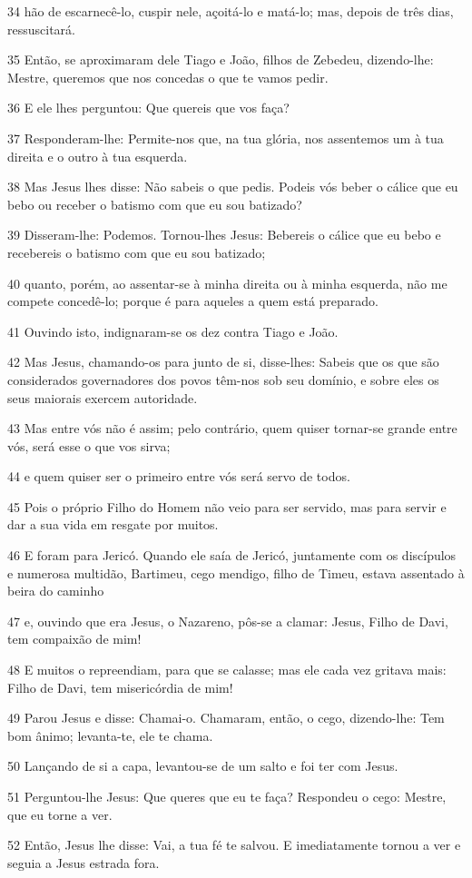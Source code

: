 \par 34 hão de escarnecê-lo, cuspir nele, açoitá-lo e matá-lo; mas, depois de três dias, ressuscitará.
\par 35 Então, se aproximaram dele Tiago e João, filhos de Zebedeu, dizendo-lhe: Mestre, queremos que nos concedas o que te vamos pedir.
\par 36 E ele lhes perguntou: Que quereis que vos faça?
\par 37 Responderam-lhe: Permite-nos que, na tua glória, nos assentemos um à tua direita e o outro à tua esquerda.
\par 38 Mas Jesus lhes disse: Não sabeis o que pedis. Podeis vós beber o cálice que eu bebo ou receber o batismo com que eu sou batizado?
\par 39 Disseram-lhe: Podemos. Tornou-lhes Jesus: Bebereis o cálice que eu bebo e recebereis o batismo com que eu sou batizado;
\par 40 quanto, porém, ao assentar-se à minha direita ou à minha esquerda, não me compete concedê-lo; porque é para aqueles a quem está preparado.
\par 41 Ouvindo isto, indignaram-se os dez contra Tiago e João.
\par 42 Mas Jesus, chamando-os para junto de si, disse-lhes: Sabeis que os que são considerados governadores dos povos têm-nos sob seu domínio, e sobre eles os seus maiorais exercem autoridade.
\par 43 Mas entre vós não é assim; pelo contrário, quem quiser tornar-se grande entre vós, será esse o que vos sirva;
\par 44 e quem quiser ser o primeiro entre vós será servo de todos.
\par 45 Pois o próprio Filho do Homem não veio para ser servido, mas para servir e dar a sua vida em resgate por muitos.
\par 46 E foram para Jericó. Quando ele saía de Jericó, juntamente com os discípulos e numerosa multidão, Bartimeu, cego mendigo, filho de Timeu, estava assentado à beira do caminho
\par 47 e, ouvindo que era Jesus, o Nazareno, pôs-se a clamar: Jesus, Filho de Davi, tem compaixão de mim!
\par 48 E muitos o repreendiam, para que se calasse; mas ele cada vez gritava mais: Filho de Davi, tem misericórdia de mim!
\par 49 Parou Jesus e disse: Chamai-o. Chamaram, então, o cego, dizendo-lhe: Tem bom ânimo; levanta-te, ele te chama.
\par 50 Lançando de si a capa, levantou-se de um salto e foi ter com Jesus.
\par 51 Perguntou-lhe Jesus: Que queres que eu te faça? Respondeu o cego: Mestre, que eu torne a ver.
\par 52 Então, Jesus lhe disse: Vai, a tua fé te salvou. E imediatamente tornou a ver e seguia a Jesus estrada fora.

